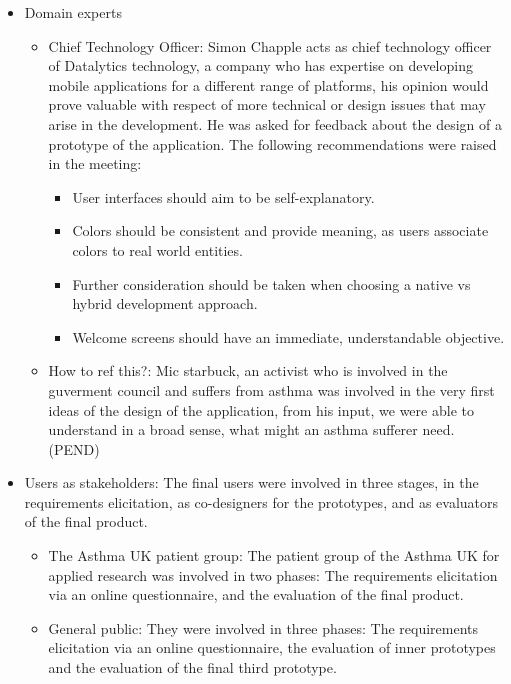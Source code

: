 \begin{itemize}
	\item Domain experts    
   \begin{itemize}
      \item Chief Technology Officer: Simon Chapple acts as chief technology officer of Datalytics technology, a company who has expertise on developing mobile applications for a different range of platforms, his opinion would prove valuable with respect of more technical or design issues that may arise in the development. He was asked for feedback about the design of a prototype of the application.
    The following recommendations were raised in the meeting:
    \begin{itemize}
		\item User interfaces should aim to be self-explanatory. 
		\item Colors should be consistent and provide meaning, as users associate colors to real world entities.
		\item Further consideration should be taken when choosing a native vs hybrid development approach.
		\item Welcome screens should have an immediate, understandable objective.   
	\end{itemize}
	\item How to ref this?: Mic starbuck, an activist who is involved in the guverment council and suffers from asthma was involved in the very first ideas of the design of the application, from his input, we were able to understand in a broad sense, what might an asthma sufferer need. (PEND)
	\end{itemize}

	\item Users as stakeholders: The final users were involved in three stages, in the requirements elicitation, as co-designers for the prototypes, and as evaluators  of the final product. 
    \begin{itemize}

		    \item The Asthma UK patient group: The patient group of the Asthma UK for applied research was involved in two phases: The requirements elicitation via an online questionnaire, and the evaluation of the final product.
			\item General public: They were involved in three phases: The requirements elicitation via an online questionnaire, the evaluation of inner prototypes and the evaluation of the final third prototype. 

	\end{itemize}

\end{itemize}

